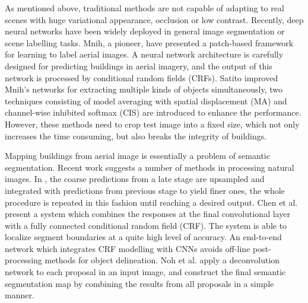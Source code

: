 \documentclass[runningheads]{llncs}
\begin{document}
    As mentioned above, traditional methods are not capable of adapting to real scenes with huge variational appearance, occlusion or low contrast. Recently, deep neural networks have been widely deployed in general image segmentation or scene labelling tasks. Mnih, a pioneer, have presented a patch-based framework for learning to label aerial images\cite{Mnih2013Machine}. A  neural network architecture is carefully designed for predicting buildings in aerial imagery, and the output of this network is processed by conditional random fields (CRFs). Satito \cite{Saito2016Multiple} improved Mnih's networks for extracting multiple kinds of objects simultaneously, two techniques consisting of model averaging with spatial displacement (MA) and channel-wise inhibited softmax (CIS) are introduced to enhance the  performance. However, these methods need to crop test image into a fixed size, which not only increases the time consuming, but also breaks the integrity of buildings. 
   
   Mapping buildings from aerial image is essentially a problem of semantic segmentation. Recent work suggests a number of methods in processing natural images. In \cite{Long2014Fully}, the coarse predictions from a late stage are upsampled and integrated with predictions from previous stage to yield finer ones, the whole procedure is repeated in this fashion until reaching a desired output. Chen et al. \cite{chen14semantic} present a system which combines the responses at the final convolutional layer with a fully connected conditional random field (CRF). The system is able to localize segment boundaries at a quite high level of accuracy. An end-to-end network \cite{Zheng2015Conditional}  which integrates CRF modelling with CNNs avoids off-line post-processing methods for object delineation. Noh et al. \cite{Noh2015Learning} apply a deconvolution network to each proposal in an input image, and construct the final semantic segmentation map by combining the results from all proposals in a simple manner.
     
\end{document}
